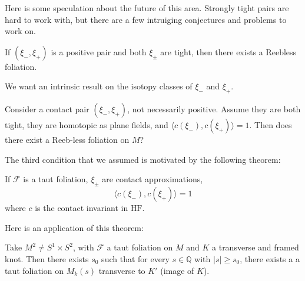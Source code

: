 Here is some speculation about the future of this area. Strongly tight pairs are hard to work with, but there are a few intruiging conjectures and problems to work on.

\begin{conjecture}
[Massoni]

If $(\xi_-, \xi_+)$ is a positive pair and both $\xi_\pm$ are tight, then there exists a Reebless foliation.

\end{conjecture}

We want an intrinsic result on the isotopy classes of $\xi_-$ and $\xi_+$.

\begin{problem}

Consider a contact pair $(\xi_-, \xi_+)$, not necessarily positive. Assume they are both tight, they are homotopic as plane fields, and $\langle c(\xi_-), c(\xi_+) \rangle=1$. Then does there exist a Reeb-less foliation on $M$?

\end{problem}

The third condition that we assumed is motivated by the following theorem:

\begin{theorem}
[Lin]

If $\mathcal{F}$ is a taut foliation, $\xi_\pm$ are contact approximations,
\[
\langle c(\xi_-), c(\xi_+) \rangle=1
\]
where $c$ is the contact invariant in $\text{HF}$.

\end{theorem}

Here is an application of this theorem:

\begin{theorem}

Take $M^2 \neq S^1 \times S^2$, with $\mathcal{F}$ a taut foliation on $M$ and $K$ a transverse and framed knot. Then there exists $s_0$ such that for every $s\in \mathbb{Q}$ with $|s|\ge s_0$, there exists a a taut foliation on $M_k(s)$ transverse to $K'$ (image of $K$).

\end{theorem}